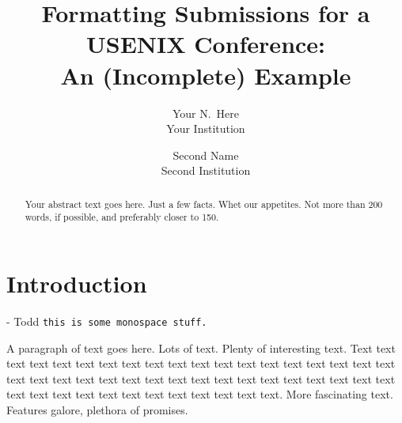 \usepackage{inconsolata}
\usepackage[outputdir=build]{minted}


\newcommand{\tg}[1]{\ifisdraft{\color{blue}[#1 -- Todd]}\fi}
\newcommand{\spack}{\texttt{Spack} }



\date{}

\title{\Large \bf Formatting Submissions for a USENIX Conference:\\
  An (Incomplete) Example}

\author{
{\rm Your N.\ Here}\\
Your Institution
\and
{\rm Second Name}\\
Second Institution
} %

\maketitle

\begin{abstract}
Your abstract text goes here. Just a few facts. Whet our appetites.
Not more than 200 words, if possible, and preferably closer to 150.
\end{abstract}


\section{Introduction}
- Todd
{\tt this is some monospace stuff.}

A paragraph of text goes here. Lots of text. Plenty of interesting
text. Text text text text text text text text text text text text text
text text text text text text text text text text text text text text
text text text text text text text text text text text text text text
text text text text text text text.
More fascinating text. Features galore, plethora of promises.

